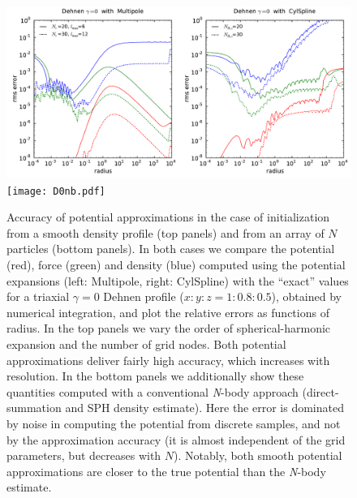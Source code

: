 \documentclass[12pt]{article}
\newcommand{\Nbody}{\textsl{N}-body\xspace}
\begin{document}
\begin{figure}
\includegraphics[width=16cm]{D0.pdf}
\texttt{[image: D0nb.pdf]}
\caption{Accuracy of potential approximations in the case of initialization from a smooth density profile (top panels) and from an array of $N$ particles (bottom panels). In both cases we compare the potential (red), force (green) and density (blue) computed using the potential expansions (left: Multipole, right: CylSpline) with the ``exact'' values for a triaxial $\gamma=0$ Dehnen profile ($x:y:z=1:0.8:0.5$), obtained by numerical integration, and plot the relative errors as functions of radius. In the top panels we vary the order of spherical-harmonic expansion and the number of grid nodes. Both potential approximations deliver fairly high accuracy, which increases with resolution. In the bottom panels we additionally show these quantities computed with a conventional \Nbody approach (direct-summation and SPH density estimate). Here the error is dominated by noise in computing the potential from discrete samples, and not by the approximation accuracy (it is almost independent of the grid parameters, but decreases with $N$). Notably, both smooth potential approximations are closer to the true potential than the \Nbody estimate.
}  \label{fig:PotentialAccuracy1}
\end{figure}
\end{document}
